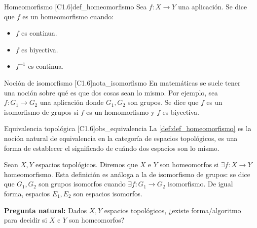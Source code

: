 \begin{definicion}{Homeomorfismo [C1.6]}{def_homeomorfismo}
Sea $f \colon X \to Y$ una aplicación. Se dice que $f$ es un homeomorfismo cuando:
\begin{itemize}
    \item $f$ es continua.
    \item $f$ es biyectiva.
    \item $f^{-1}$ es continua.
\end{itemize}
\end{definicion}

\begin{nota}{Noción de isomorfismo [C1.6]}{nota_isomorfismo}
En matemáticas se suele tener una noción sobre qué es que dos cosas sean lo mismo. Por ejemplo, sea $f \colon G_1 \to G_2$ una aplicación donde $G_1, G_2$ son grupos. Se dice que $f$ es un isomorfismo de grupos si $f$ es un homomorfismo y $f$ es biyectiva.
\end{nota}

\begin{observacion}{Equivalencia topológica [C1.6]}{obs_equivalencia}
La \cref{def:def_homeomorfismo} es la noción natural de equivalencia en la categoría de espacios topológicos, es una forma de establecer el significado de cuándo dos espacios son lo mismo.
\end{observacion}

Sean $X, Y$ espacios topológicos. Diremos que $X$ e $Y$ son homeomorfos si $\exists f \colon X \to Y$ homeomorfismo. Esta definición es análoga a la de isomorfismo de grupos: se dice que $G_1, G_2$ son grupos isomorfos cuando $\exists f \colon G_1 \to G_2$ isomorfismo. De igual forma, espacios $E_1, E_2$ son espacios isomorfos.

\textbf{Pregunta natural:} Dados $X, Y$ espacios topológicos, ¿existe forma/algoritmo para decidir si $X$ e $Y$ son homeomorfos?

